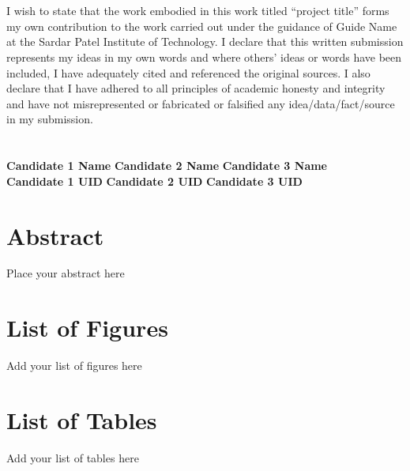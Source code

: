 \documentclass[12pt,singleside,a4paper]{article}
\begin{document}


\section*{}

\vspace{3.5cm}
I wish to state that the work embodied in this work titled “project title” forms my own contribution to the work carried out under the guidance of Guide Name at the Sardar Patel Institute of Technology. I declare that this written submission represents my ideas in my own words and where others' ideas or words have been included, I have adequately cited and referenced the original sources. I also declare that I have adhered to all principles of academic honesty and integrity and have not misrepresented or fabricated or falsified any idea/data/fact/source in my submission.
\\
\\
\\
\textbf{Candidate 1 Name} \hspace{2cm} \textbf{Candidate 2 Name} \hspace{2cm} \textbf{Candidate 3 Name}\\ 
\vspace{4cm}
\textbf{Candidate 1 UID} \hspace{3cm} \textbf{Candidate 2 UID} \hspace{2cm} \textbf{Candidate 3 UID}\\ 
\vspace{1cm}















\pagebreak
\section*{Abstract}
Place your abstract here
\pagebreak
\section*{List of Figures}
Add your list of figures here
\pagebreak
\section*{List of Tables}
Add your list of tables here
\pagebreak
\tableofcontents
\pagebreak
\end{document}
